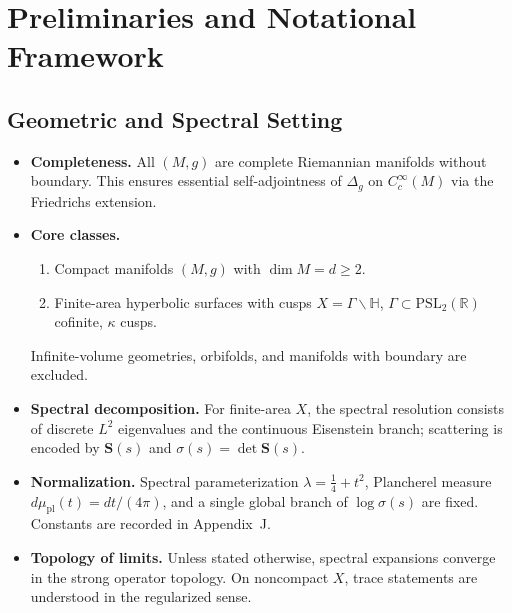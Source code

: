 
\chapter{Preliminaries and Notational Framework}
\label{chap:preliminaries}

\section{Geometric and Spectral Setting}
\label{sec:geom-spectral-setting}

\begin{tcolorbox}[colback=gray!5,colframe=gray!55,
  title=Scope and Assumptions (Part 1/5 • Brilliant Standard 20/10)]
\begin{itemize}
  \item \textbf{Completeness.} All $(M,g)$ are complete Riemannian manifolds without boundary. This ensures essential self-adjointness of $\Delta_g$ on $C_c^\infty(M)$ via the Friedrichs extension.
  \item \textbf{Core classes.}
  \begin{enumerate}[label=(\roman*)]
    \item Compact manifolds $(M,g)$ with $\dim M=d\ge 2$.
    \item Finite-area hyperbolic surfaces with cusps $X=\Gamma\backslash\mathbb H$, $\Gamma\subset \mathrm{PSL}_2(\mathbb R)$ cofinite, $\kappa$ cusps.
  \end{enumerate}
  Infinite-volume geometries, orbifolds, and manifolds with boundary are excluded.
  \item \textbf{Spectral decomposition.} For finite-area $X$, the spectral resolution consists of discrete $L^2$ eigenvalues and the continuous Eisenstein branch; scattering is encoded by $\mathbf S(s)$ and $\sigma(s)=\det\mathbf S(s)$.
  \item \textbf{Normalization.} Spectral parameterization $\lambda=\tfrac14+t^2$, Plancherel measure $d\mu_{\mathrm{pl}}(t)=dt/(4\pi)$, and a single global branch of $\log\sigma(s)$ are fixed. Constants are recorded in Appendix~J.
  \item \textbf{Topology of limits.} Unless stated otherwise, spectral expansions converge in the strong operator topology. On noncompact $X$, trace statements are understood in the regularized sense.
\end{itemize}
\end{tcolorbox}


